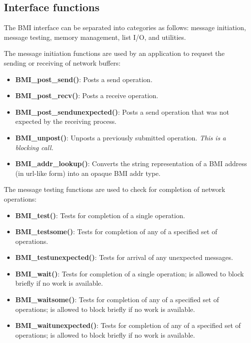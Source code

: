 \documentclass[11pt]{article}
\begin{document}
\subsection{Interface functions}

The BMI interface can be separated into categories as follows:  message
initiation, message testing, memory management, list I/O, and utilities. 

The message initiation functions are used by an application to 
request the sending or receiving of network buffers:

\begin{itemize}
\item \textbf{BMI\_post\_send()}: Posts a send operation.
\item \textbf{BMI\_post\_recv()}: Posts a receive operation.
\item \textbf{BMI\_post\_sendunexpected()}: Posts a send operation
that was not expected by the receiving process.
\item \textbf{BMI\_unpost()}: Unposts a previously submitted
operation.  \emph{This is a blocking call.}
\item \textbf{BMI\_addr\_lookup()}: Converts the string
representation of a BMI address (in url-like form) into an opaque
BMI addr type.
\end{itemize}

The message testing functions are used to check for completion of
network operations:

\begin{itemize}

\item \textbf{BMI\_test()}: Tests for completion of a single
operation.
\item \textbf{BMI\_testsome()}: Tests for completion of any of a
specified set of operations.
\item \textbf{BMI\_testunexpected()}: Tests for arrival of any
unexpected messages.
\item \textbf{BMI\_wait()}:  Tests for completion of a single
operation; is allowed to block briefly if no work is available.
\item \textbf{BMI\_waitsome()}: Tests for completion of any of a
specified set of operations; is allowed to block briefly if no
work is available.
\item \textbf{BMI\_waitunexpected()}: Tests for completion of any
of a specified set of operations; is allowed to block briefly if
no work is available.
\end{itemize}
\end{document}
